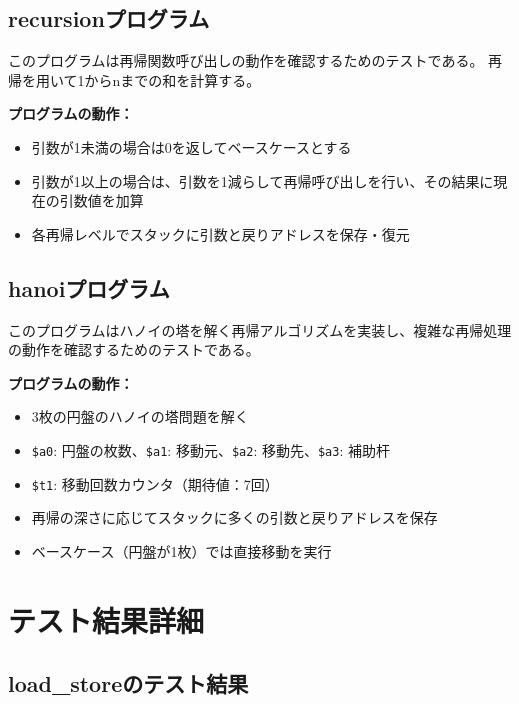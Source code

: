 \documentclass[dvipdfmx]{jsarticle}
\begin{document}
\subsection{recursionプログラム}
\label{appendix:recursion_asm}
このプログラムは再帰関数呼び出しの動作を確認するためのテストである。
再帰を用いて1からnまでの和を計算する。



\textbf{プログラムの動作：}
\begin{itemize}
\item 引数が1未満の場合は0を返してベースケースとする
\item 引数が1以上の場合は、引数を1減らして再帰呼び出しを行い、その結果に現在の引数値を加算
\item 各再帰レベルでスタックに引数と戻りアドレスを保存・復元
\end{itemize}

\subsection{hanoiプログラム}
\label{appendix:hanoi_asm}
このプログラムはハノイの塔を解く再帰アルゴリズムを実装し、複雑な再帰処理の動作を確認するためのテストである。



\textbf{プログラムの動作：}
\begin{itemize}
\item 3枚の円盤のハノイの塔問題を解く
\item \texttt{\$a0}: 円盤の枚数、\texttt{\$a1}: 移動元、\texttt{\$a2}: 移動先、\texttt{\$a3}: 補助杆
\item \texttt{\$t1}: 移動回数カウンタ（期待値：7回）
\item 再帰の深さに応じてスタックに多くの引数と戻りアドレスを保存
\item ベースケース（円盤が1枚）では直接移動を実行
\end{itemize}

\section{テスト結果詳細}

\subsection{load\_storeのテスト結果}
\label{appendix:load_store}

\end{document}
